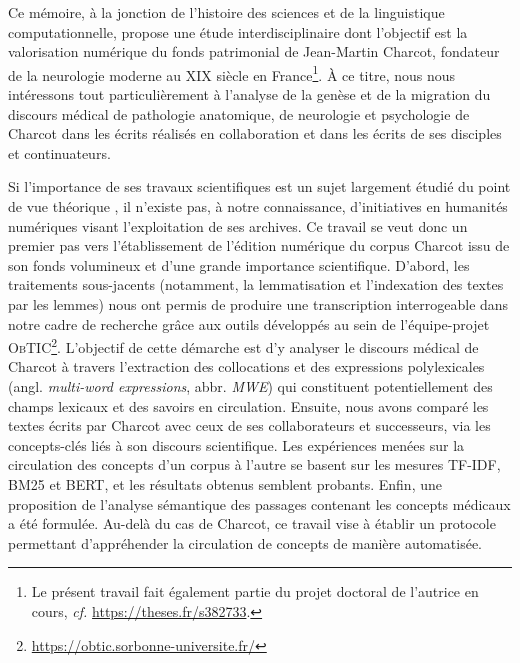 \label{intro}
Ce mémoire, à la jonction de l'histoire des sciences et de la linguistique computationnelle, propose une étude interdisciplinaire dont l'objectif est la valorisation numérique du fonds patrimonial de Jean-Martin Charcot, fondateur de la neurologie moderne au XIX\ieme{} siècle en France\footnote{Le présent travail fait également partie du projet doctoral de l'autrice en cours, \textit{cf.} \url{https://theses.fr/s382733}.}. À ce titre, nous nous intéressons tout particulièrement à l'analyse de la genèse et de la migration du discours médical de pathologie anatomique, de neurologie et psychologie de Charcot dans les écrits réalisés en collaboration et dans les écrits de ses disciples et continuateurs. 

Si l'importance de ses travaux scientifiques est un sujet largement étudié du point de vue théorique \citep{bogousslavsky2011following,broussolle2012,camargo2024}, il n'existe pas, à notre connaissance, d'initiatives en humanités numériques visant l'exploitation de ses archives. Ce travail se veut donc un premier pas vers l'établissement de l'édition numérique du corpus Charcot issu de son fonds volumineux et d'une grande importance scientifique. D'abord, les traitements sous-jacents (notamment, la lemmatisation et l'indexation des textes par les lemmes) nous ont permis de produire une transcription interrogeable dans notre cadre de recherche grâce aux outils développés au sein de l'équipe-projet \textsc{ObTIC}\footnote{\url{https://obtic.sorbonne-universite.fr/}}. L'objectif de cette démarche est d'y analyser le discours médical de Charcot à travers l'extraction des collocations et des expressions polylexicales (angl. \textit{multi-word expressions}, abbr. \textit{\textsc{MWE}}) qui constituent potentiellement des champs lexicaux et des savoirs en circulation. Ensuite, nous avons comparé les textes écrits par Charcot avec ceux de ses collaborateurs et successeurs, via les concepts-clés liés à son discours scientifique. Les expériences menées sur la circulation des concepts d'un corpus à l'autre se basent sur les mesures \textsc{TF-IDF}, \textsc{BM25} et \textsc{BERT}, et les résultats obtenus semblent probants. Enfin, une proposition de l'analyse sémantique des passages contenant les concepts médicaux a été formulée. Au-delà du cas de Charcot, ce travail vise à établir un protocole permettant d'appréhender la circulation de concepts de manière
automatisée.


